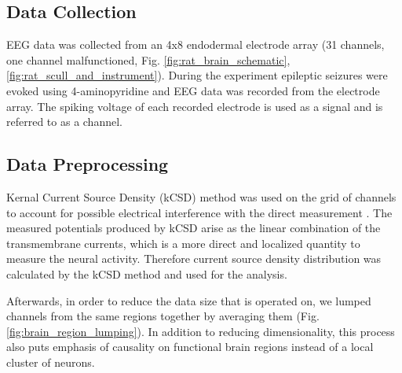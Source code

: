 \documentclass[journal,12pt,onecolumn,draftclsnofoot]{IEEEtran}  %
\begin{document}
\subsection{Data Collection}
EEG data was collected from an 4x8 endodermal electrode array (31 channels, one channel malfunctioned, Fig. \ref{fig:rat_brain_schematic}, \ref{fig:rat_scull_and_instrument}). During the experiment epileptic seizures were evoked using 4-aminopyridine and EEG data was recorded from the electrode array. The spiking voltage of each recorded electrode is used as a signal and is referred to as a channel. 

\subsection{Data Preprocessing}
Kernal Current Source Density (kCSD) method was used on the grid of channels to account for possible electrical interference with the direct measurement \cite{Potworowski2012}. The measured potentials produced by kCSD arise as the linear combination of the transmembrane currents, which is a more direct and localized quantity to measure the neural activity. Therefore current source density distribution was calculated by the kCSD method and used for the analysis.

Afterwards, in order to reduce the data size that is operated on, we lumped channels from the same regions together by averaging them (Fig. \ref{fig:brain_region_lumping}). In addition to reducing dimensionality, this process also puts emphasis of causality on functional brain regions instead of a local cluster of neurons. 

  
\end{document}
